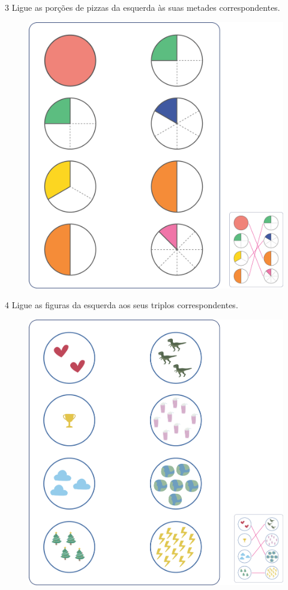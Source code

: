 \pagebreak
\num{3} Ligue as porções de pizzas da esquerda às suas metades correspondentes.

\begin{figure}[htpb!]
\includegraphics[width=\textwidth]{./media/image106.png}
\end{figure}

\pagebreak
\num{4} Ligue as figuras da esquerda aos seus triplos correspondentes.

\begin{figure}[htpb!]
\includegraphics[width=\textwidth]{./media/image107.png}
\end{figure}

